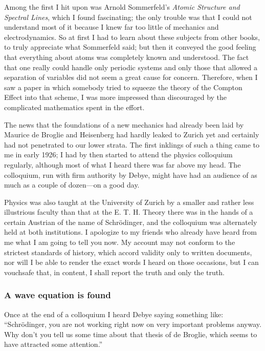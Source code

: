\documentclass[12pt]{article}
\begin{document}
Among the first I hit upon was Arnold Sommerfeld's {\it Atomic Structure and Spectral Lines}, which I found fascinating; the only trouble was that I could not understand most of it because I knew far too little of mechanics and electrodynamics. So at first I had to learn about these subjects from other books, to truly appreciate what Sommerfeld said; but then it conveyed the good feeling that everything about atoms was completely known and understood. The fact that one really could handle only periodic systems and only those that allowed a separation of variables did not seem a great cause for concern. Therefore, when I saw a paper in which somebody tried to squeeze the theory of the Compton Effect into that scheme, I was more impressed than discouraged by the complicated mathematics spent in the effort.

The news that the foundations of a new mechanics had already been laid by Maurice de Broglie and Heisenberg had hardly leaked to Zurich yet and certainly had not penetrated to our lower strata. The first inklings of such a thing came to me in early 1926; I had by then started to attend the physics colloquium regularly, although most of what I heard there was far above my head. The colloquium, run
with firm authority by Debye, might have had an audience of as much as a couple of dozen---on a good day.

Physics was also taught at the University of Zurich by a smaller and rather less illustrious faculty than that at the E. T. H. Theory there was in the hands of a certain Austrian of the name of Schr\"odinger, and the colloquium was alternately held at both institutions. I apologize to my friends who already have heard from me what I am going to tell you now. My account may not conform to the strictest standards of history, which accord validity only to written documents, nor will I be able to render the exact words I heard on those occasions, but I can vouchsafe that, in content, I shall report the truth and only the truth.

\subsubsection*{A wave equation is found}

Once at the end of a colloquium I heard Debye saying something like: ``Schr\"odinger, you are not working right now on very important problems anyway. Why don't you tell us some time about that thesis of de Broglie, which seems to have attracted some attention.''
\end{document}
